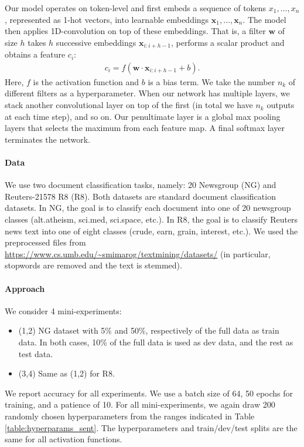 Our model operates on token-level and first embeds a sequence of tokens $x_1,\ldots,x_n$, represented as 1-hot vectors, into learnable embeddings $\mathbf{x}_1,\ldots,\mathbf{x}_n$. The model then applies 1D-convolution on top of these embeddings. That is, a filter $\mathbf{w}$ of size $h$ takes $h$ successive embeddings $\mathbf{x}_{i:i+h-1}$, performs a scalar product and obtains a feature $c_i$:
\begin{align*}
  c_i = f(\mathbf{w}\cdot \mathbf{x}_{i:i+h-1}+b).
\end{align*}
Here, $f$ is the activation function and $b$ is a bias term. We take the number $n_k$ of different filters as a hyperparameter. When our network has multiple layers, we stack another convolutional layer on top of the first (in total we have $n_k$ outputs at each time step), and so on. Our penultimate layer is a global max pooling layers that selects the maximum from each feature map. A final softmax layer terminates the network. 
\paragraph{Data} We use two document classification tasks, namely: 20 Newsgroup (NG) and Reuters-21578 R8 (R8). Both datasets are standard document classification datasets. In NG, the goal is to classify each document into one of 20 newsgroup classes (alt.atheism, sci.med, sci.space, etc.). In R8, the goal is to classify Reuters news text into one of eight classes (crude, earn, grain, interest, etc.).  We used the preprocessed files from \url{https://www.cs.umb.edu/~smimarog/textmining/datasets/} (in particular, stopwords are removed and the text is stemmed).
\paragraph{Approach}
We consider 4 mini-experiments:
\begin{itemize}[noitemsep,leftmargin=0.6cm]
\item (1,2) NG dataset with 5\% and 50\%, respectively of the full data as train data. In both cases, 10\% of the full data is used as dev data, and the rest as test data.  
\item (3,4) Same as (1,2) for R8. 
\end{itemize}
We report accuracy for all experiments. We use a batch size of 64, 50 epochs for training, and a patience of 10. For all mini-experiments, we again draw 200 randomly chosen hyperparameters from the ranges indicated in Table \ref{table:hyperparams_sent}. 
The hyperparameters and train/dev/test splits are the same for all activation functions. 

